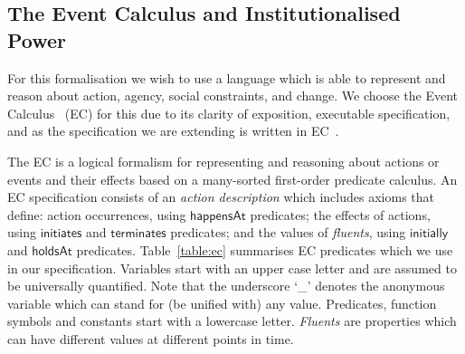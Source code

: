 
\subsection{The Event Calculus and Institutionalised Power}

For this formalisation we wish to use a language which is able to represent and reason about action, agency, social constraints, and change. 
We choose the Event Calculus~\citep{Kowalski1986} (EC) for this due to its clarity of exposition, executable specification, and as the specification we are extending is written in EC~\citep{Pitt2012b}.

The EC is a logical formalism for representing and reasoning about actions or events and their effects based on a many-sorted first-order predicate calculus. 
An EC specification consists of an \emph{action description} which includes axioms that define: action occurrences, using $\mathsf{happensAt}$ predicates; the effects of actions, using $\mathsf{initiates}$ and $\mathsf{terminates}$ predicates; and the values of \emph{fluents}, using $\mathsf{initially}$ and $\mathsf{holdsAt}$ predicates. 
Table~\ref{table:ec} summarises EC predicates which we use in our specification. 
Variables start with an upper case letter and are assumed to be universally quantified. Note that the underscore `\_' denotes
the anonymous variable which can stand for (be unified with) any value. 
Predicates, function symbols and constants start with a lowercase letter. 
\emph{Fluents} are properties which can have different values at different points in time.

